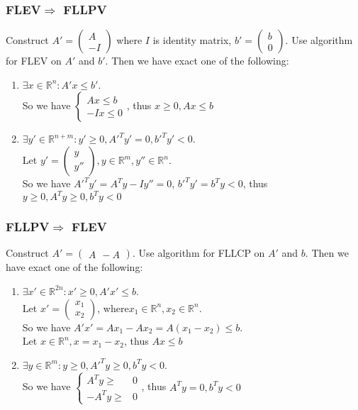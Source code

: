 	\subsubsection*{FLEV$\Rightarrow$ FLLPV}
	Construct \boldmath $A'=
	\begin{pmatrix}
	A\\ -I
	\end{pmatrix}$ where $I$ is identity matrix, $b'=\begin{pmatrix}
	b\\ 0
	\end{pmatrix}$. Use algorithm for FLEV on $A'$ and $b'$. Then we have exact one of the following:
	\begin{enumerate}
		\item $\exists x\in \mathbb{R}^n:A'x\leq b'$.\\ So we have $\left\{\begin{aligned}
		Ax\leq b\\
		-Ix\leq 0
		\end{aligned}\right.$, thus $x\geq 0,Ax\leq b$
		\item $\exists y'\in \mathbb{R}^{n+m}:y'\geq 0,A'^Ty'= 0,b'^Ty'<0$.\\ Let $y'=\begin{pmatrix}
		y\\y''
		\end{pmatrix},y\in \mathbb{R}^m,y''\in \mathbb{R}^n$.\\ So we have $A'^Ty'=A^Ty-Iy''=0$, $b'^Ty'=b^Ty<0$, thus $y\geq0,A^Ty\geq 0,b^Ty<0$
	\end{enumerate}
	\subsubsection*{FLLPV$\Rightarrow$ FLEV}
	Construct \boldmath $A'=
	\begin{pmatrix}
	A\ \ -A
	\end{pmatrix}$. Use algorithm for FLLCP on $A'$ and $b$. Then we have exact one of the following:
	\begin{enumerate}
		\item $\exists x'\in \mathbb{R}^{2n}:x'\geq 0,A'x'\leq b$.\\ Let $x'=\begin{pmatrix}
		x_1\\ x_2
		\end{pmatrix}$, where$x_1\in \mathbb{R}^n,x_2\in \mathbb{R}^n$.\\ So we have $A'x'=Ax_1-Ax_2=A(x_1-x_2)\leq b$. \\Let $x\in \mathbb{R}^n,x=x_1-x_2$, thus $Ax\leq b$
		\item $\exists y\in \mathbb{R}^m:y\geq 0,A'^Ty\geq 0,b^Ty<0$.\\ So we have $\left\{\begin{aligned}
		A^Ty\geq& 0\\
		-A^Ty\geq& 0
		\end{aligned}\right.$, thus $A^Ty=0,b^Ty<0$
	\end{enumerate}

